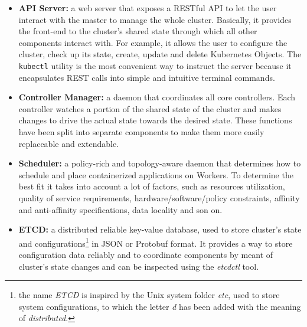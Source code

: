 \begin{itemize}
	
	\item \textbf{API Server:} a web server that exposes a RESTful API to let the user interact with the master to manage the whole cluster.
	Basically, it provides the front-end to the cluster’s shared state through which all other components interact with.
	For example, it allows the user to configure the cluster, check up its state, create, update and delete Kubernetes Objects.
	The \texttt{kubectl} utility is the most convenient way to instruct the server because it encapsulates REST calls into simple and intuitive terminal commands.
	
	\item \textbf{Controller Manager:} a daemon that coordinates all core controllers.
	Each controller watches a portion of the shared state of the cluster and makes changes to drive the actual state towards the desired state.
	These functions have been split into separate components to make them more easily replaceable and extendable.	
	
	\item \textbf{Scheduler:} a policy-rich and topology-aware daemon that determines how to schedule and place containerized applications on Workers.
	To determine the best fit it takes into account a lot of factors, such as resources utilization, quality of service requirements, hardware/software/policy constraints, affinity and anti-affinity specifications, data locality and son on.
	
	\item \textbf{ETCD:} a distributed reliable key-value database, used to store cluster's state and configurations\footnote{the name \textit{ETCD} is inspired by the Unix system folder \textit{etc}, used to store system configurations, to which the letter \textit{d} has been added with the meaning of \textit{distributed}.} in JSON or Protobuf format.
	It provides a way to store configuration data reliably and to coordinate components by meant of cluster's state changes and can be inspected using the \textit{etcdctl} tool.
	
\end{itemize}

